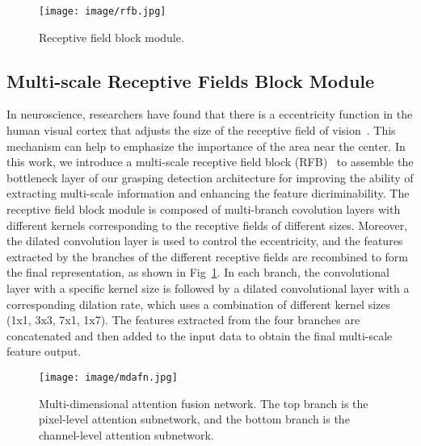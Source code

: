 \documentclass[journal]{IEEEtran}
\begin{document}
\begin{figure}[t!]
{\texttt{[image: image/rfb.jpg]}}
	\caption{Receptive field block module.}
	\label{fig:rfb}
\end{figure} 

\subsection{Multi-scale Receptive Fields Block Module}
\label{sec:Multi-Scale feature map}
In neuroscience, researchers have found that there is a eccentricity function in the human visual cortex that adjusts the size of the receptive field of vision~\cite{neuroscience}. This mechanism can help to emphasize the importance of the area near the center. In this work, we introduce a multi-scale receptive field block (RFB)~\cite{rfb} to assemble the bottleneck layer of our grasping detection architecture for improving the ability of extracting multi-scale information and enhancing the feature dicriminability. The receptive field block module is composed of multi-branch covolution layers with different kernels corresponding to the receptive fields of different sizes. Moreover, the dilated convolution layer is used to control the eccentricity, and the features extracted by the branches of the different receptive fields are recombined to form the final representation, as shown in Fig~\ref{fig:rfb}. In each branch, the convolutional layer with a specific kernel size is followed by a dilated convolutional layer with a corresponding dilation rate, which uses a combination of different kernel sizes (1x1, 3x3, 7x1, 1x7). The features extracted from the four branches are concatenated and then added to the input data to obtain the final multi-scale feature output.

\begin{figure}[t!]
{\texttt{[image: image/mdafn.jpg]}}
	\caption{Multi-dimensional attention fusion network. The top branch is the pixel-level attention subnetwork, and the bottom branch is the channel-level attention subnetwork.}
	\label{fig:mdafn}
\end{figure} 
\end{document}
